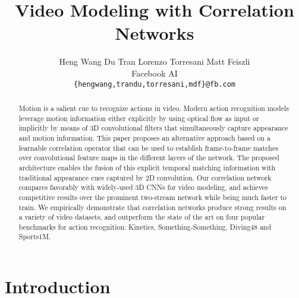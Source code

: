 \documentclass[10pt,twocolumn,letterpaper]{article}
\begin{document}
\title{Video Modeling with Correlation Networks}

\author{Heng Wang \qquad Du Tran \qquad Lorenzo Torresani  \qquad Matt Feiszli\\
Facebook AI\\
{\tt\small \{hengwang,trandu,torresani,mdf\}@fb.com}
}

\maketitle

\begin{abstract}
Motion is a salient cue to recognize actions in video. Modern action recognition models leverage motion information either explicitly by using optical flow as input or implicitly by means of 3D convolutional filters that simultaneously capture appearance and motion information. This paper proposes an alternative approach based on a learnable correlation operator that can be used to establish frame-to-frame matches over convolutional feature maps in the different layers of the network. The proposed architecture enables the fusion of this explicit temporal matching information with traditional appearance cues captured by 2D convolution. Our correlation network compares favorably with widely-used 3D CNNs for video modeling, and achieves competitive results over the prominent two-stream network while being much faster to train. We empirically demonstrate that correlation networks produce strong results on a variety of video datasets, and outperform the state of the art on four popular benchmarks for action recognition: Kinetics, Something-Something, Diving48 and Sports1M.
\end{abstract}

\section{Introduction}
\end{document}

